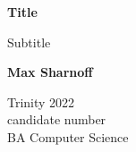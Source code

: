 \documentclass[12pt]{article}
\begin{document}

\begin{titlepage}
\begin{center}
    \Huge
    \textbf{Title}

    \vspace*{0.4cm}
    \LARGE
    Subtitle

    \vspace{1.5cm}
    \textbf{Max Sharnoff}

    Trinity 2022 \\
    candidate number \\
    BA Computer Science

\end{center}
\end{titlepage}

\newpage\ \addtocounter{page}{-1} \thispagestyle{empty}

\newpage


\newpage
\tableofcontents

\newpage


\newpage


\newpage


\newpage


\newpage


\newpage
{}

\end{document}
